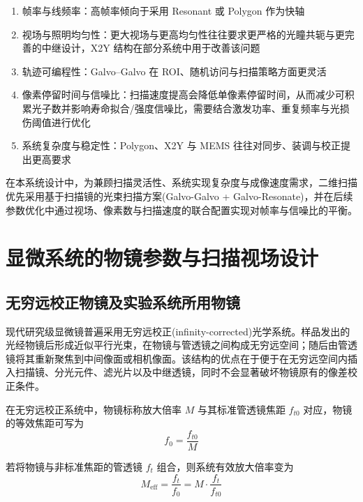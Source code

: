 \begin{enumerate}
    \item 帧率与线频率：高帧率倾向于采用 Resonant 或 Polygon 作为快轴
    \item 视场与照明均匀性：更大视场与更高均匀性往往要求更严格的光瞳共轭与更完善的中继设计，X2Y 结构在部分系统中用于改善该问题
    \item 轨迹可编程性：Galvo–Galvo 在 ROI、随机访问与扫描策略方面更灵活
    \item 像素停留时间与信噪比：扫描速度提高会降低单像素停留时间，从而减少可积累光子数并影响寿命拟合/强度信噪比，需要结合激发功率、重复频率与光损伤阈值进行优化
    \item 系统复杂度与稳定性：Polygon、X2Y 与 MEMS 往往对同步、装调与校正提出更高要求
\end{enumerate}

在本系统设计中，为兼顾扫描灵活性、系统实现复杂度与成像速度需求，二维扫描优先采用基于扫描镜的光束扫描方案(Galvo-Galvo + Galvo-Resonate)，并在后续参数优化中通过视场、像素数与扫描速度的联合配置实现对帧率与信噪比的平衡。



\section{显微系统的物镜参数与扫描视场设计}\label{2.4}

\subsection{无穷远校正物镜及实验系统所用物镜}\label{2.4.1}

现代研究级显微镜普遍采用无穷远校正(infinity-corrected)光学系统。样品发出的光经物镜后形成近似平行光束，在物镜与管透镜之间构成无穷远空间；随后由管透镜将其重新聚焦到中间像面或相机像面。该结构的优点在于便于在无穷远空间内插入扫描镜、分光元件、滤光片以及中继透镜，同时不会显著破坏物镜原有的像差校正条件。

在无穷远校正系统中，物镜标称放大倍率 $M$ 与其标准管透镜焦距 $f_{t0}$ 对应，物镜的等效焦距可写为
\begin{equation}
f_{0}=\frac{f_{t0}}{M}
\label{eq:f0_def}
\end{equation}

若将物镜与非标准焦距的管透镜 $f_t$ 组合，则系统有效放大倍率变为
\begin{equation}
M_{\mathrm{eff}}=\frac{f_t}{f_0}=M\cdot\frac{f_t}{f_{t0}}
\label{eq:Meff_def}
\end{equation}

